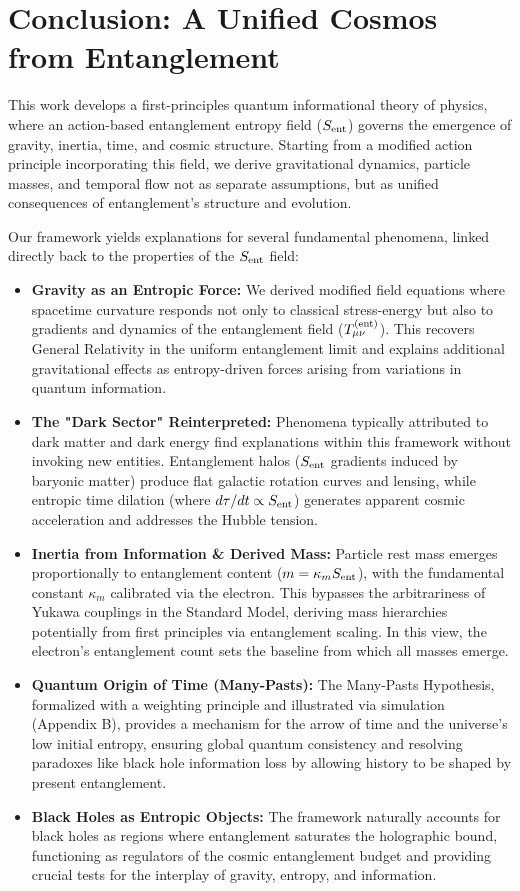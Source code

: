 \documentclass[11pt]{article}
\begin{document}
\section{Conclusion: A Unified Cosmos from Entanglement}

This work develops a first-principles quantum informational theory of physics, where an action-based entanglement entropy field ($S_{\rm ent}$) governs the emergence of gravity, inertia, time, and cosmic structure. Starting from a modified action principle incorporating this field, we derive gravitational dynamics, particle masses, and temporal flow not as separate assumptions, but as unified consequences of entanglement’s structure and evolution.

Our framework yields explanations for several fundamental phenomena, linked directly back to the properties of the $S_{\rm ent}$ field:
\begin{itemize}
    \item \textbf{Gravity as an Entropic Force:} We derived modified field equations where spacetime curvature responds not only to classical stress-energy but also to gradients and dynamics of the entanglement field ($T_{\mu\nu}^{\rm (ent)}$). This recovers General Relativity in the uniform entanglement limit and explains additional gravitational effects as entropy-driven forces arising from variations in quantum information.
    \item \textbf{The "Dark Sector" Reinterpreted:} Phenomena typically attributed to dark matter and dark energy find explanations within this framework without invoking new entities. Entanglement halos ($S_{\rm ent}$ gradients induced by baryonic matter) produce flat galactic rotation curves and lensing, while entropic time dilation (where $d\tau/dt \propto S_{\rm ent}$) generates apparent cosmic acceleration and addresses the Hubble tension.
    \item \textbf{Inertia from Information \& Derived Mass:} Particle rest mass emerges proportionally to entanglement content ($m = \kappa_m S_{\rm ent}$), with the fundamental constant $\kappa_m$ calibrated via the electron. This bypasses the arbitrariness of Yukawa couplings in the Standard Model, deriving mass hierarchies potentially from first principles via entanglement scaling. In this view, the electron's entanglement count sets the baseline from which all masses emerge.
    \item \textbf{Quantum Origin of Time (Many-Pasts):} The Many-Pasts Hypothesis, formalized with a weighting principle and illustrated via simulation (Appendix B), provides a mechanism for the arrow of time and the universe's low initial entropy, ensuring global quantum consistency and resolving paradoxes like black hole information loss by allowing history to be shaped by present entanglement.
    \item \textbf{Black Holes as Entropic Objects:} The framework naturally accounts for black holes as regions where entanglement saturates the holographic bound, functioning as regulators of the cosmic entanglement budget and providing crucial tests for the interplay of gravity, entropy, and information.
\end{itemize}
\end{document}
